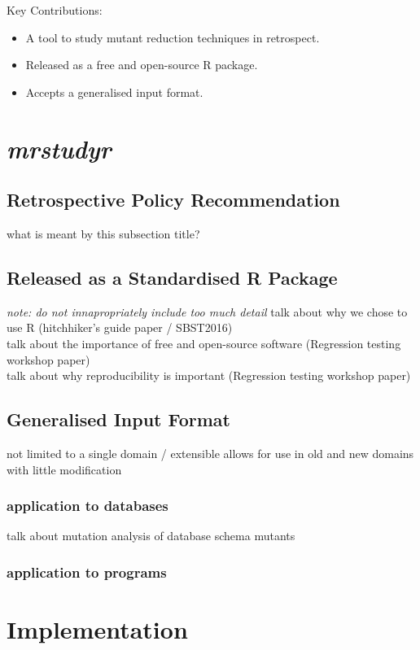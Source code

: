 \documentclass[conference]{IEEEtran}
\begin{document}
    Key Contributions:
    \begin{itemize}
        \item A tool to study mutant reduction techniques in retrospect.
        \item Released as a free and open-source R package.
        \item Accepts a generalised input format.
    \end{itemize}


\section{\textit{mrstudyr}}
\subsection{Retrospective Policy Recommendation}
what is meant by this subsection title?

\subsection{Released as a Standardised R Package}
\textit{note: do not innapropriately include too much detail}
talk about why we chose to use R (hitchhiker's guide paper / SBST2016)\\
talk about the importance of free and open-source software (Regression testing workshop paper)\\
talk about why reproducibility is important (Regression testing workshop paper)

\subsection{Generalised Input Format}
not limited to a single domain / extensible
allows for use in old and new domains with little modification
    \subsubsection{application to databases}
    talk about mutation analysis of database schema mutants
    \subsubsection{application to programs}

\section{Implementation}
\end{document}
